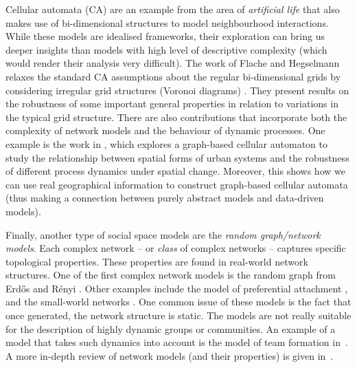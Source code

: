 \documentclass[preprint,number]{elsarticle}
\begin{document}
	Cellular automata (CA) are an example from the area of \textit{artificial life} that also
        makes use of bi-dimensional structures to model neighbourhood interactions. While these
        models are idealised frameworks, their exploration can bring us deeper insights than models
        with high level of descriptive complexity (which would render their analysis very
        difficult). The work of Flache and Hegselmann relaxes the standard CA assumptions about the
        regular bi-dimensional grids by considering irregular grid structures (Voronoi diagrams)
        \cite{FlacheHegselmann2001}. They present results on the robustness of some important
        general properties in relation to variations in the typical grid structure. There are also
        contributions that incorporate both the complexity of network models and the behaviour of
        dynamic processes. One example is the work in \cite{Sullivan2000}, which explores a
        graph-based cellular automaton to study the relationship between spatial forms of urban
        systems and the robustness of different process dynamics under spatial change. Moreover,
        this shows how we can use real geographical information to construct graph-based cellular
        automata (thus making a connection between purely abstract models and data-driven models).
	
	Finally, another type of social space models are the \textit{random graph/network
          models}. Each complex network -- or \textit{class} of complex networks -- captures
        specific topological properties. These properties are found in real-world network
        structures. One of the first complex network models is the random graph from Erd\H{o}s and
        Rényi \cite{Erdos1959}. Other examples include the model of preferential attachment
        \cite{Barabasi1999}, and the small-world networks \cite{Watts1998}. One common issue of
        these models is the fact that once generated, the network structure is static. The models
        are not really suitable for the description of highly dynamic groups or communities. An
        example of a model that takes such dynamics into account is the model of team
        formation in~\cite{Gaston2005}. A more in-depth review of network models (and their properties)
        is given in~\cite{Nunes2012}.
	
	
\end{document}
